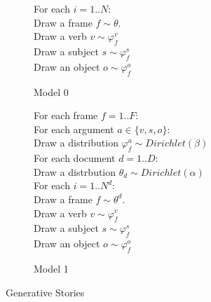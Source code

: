 \documentclass{article} %
\renewcommand\phi\varphi
\begin{document}
\begin{figure}[h]

  \begin{subfigure}[b]{0.45\textwidth}

    \begin{snugshade}
    \scriptsize
    For each $i = 1..N$:\\
    \hspace*{15pt} Draw a frame $f \sim \theta$.\\
    \hspace*{15pt} Draw a verb $v \sim \phi_f^v$\\
    \hspace*{15pt} Draw a subject $s \sim \phi_f^s$\\
    \hspace*{15pt} Draw an object $o \sim \phi_f^o$
    \end{snugshade}

    

    \caption{Model 0}
    \label{gen0}

  \end{subfigure}
  \hfill
  \begin{subfigure}[b]{0.45\textwidth}

    \begin{snugshade}
    \scriptsize
    For each frame $f=1..F$:\\
    \hspace*{15pt} For each argument $a\in\{v,s,o\}$:\\
    \hspace*{30pt} Draw a distribution $\phi_f^a\sim Dirichlet(\beta)$\\
    For each document $d=1..D$:\\
    \hspace*{15pt} Draw a distrbution $\theta_d \sim Dirichlet(\alpha)$\\
    \hspace*{30pt} For each $i = 1..N^d$:\\
    \hspace*{30pt} Draw a frame $f \sim \theta^d$.\\
    \hspace*{30pt} Draw a verb $v \sim \phi_f^v$\\
    \hspace*{30pt} Draw a subject $s \sim \phi_f^s$\\
    \hspace*{30pt} Draw an object $o \sim \phi_f^o$
    \end{snugshade}

    

    \caption{Model 1}
    \label{gen1}

  \end{subfigure}

  \caption{Generative Stories}

\end{figure}
\end{document}
